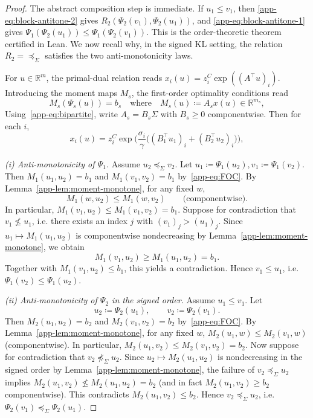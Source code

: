 \documentclass{article}
\theoremstyle{plain}
\newcommand{\eqdef}{\coloneqq}
\newcommand{\RR}{\mathbb{R}}
\newcommand{\z}{z}
\newcommand{\zC}{\z^C}
\begin{document}
\begin{proof}
The abstract composition step is immediate. If $u_1\le v_1$, then
\eqref{app-eq:block-antitone-2} gives
$R_2(\Psi_2(v_1),\Psi_2(u_1))$, and \eqref{app-eq:block-antitone-1} gives
$\Psi_1(\Psi_2(u_1))\le\Psi_1(\Psi_2(v_1))$.
This is the order-theoretic theorem certified in Lean. We now recall why, in the signed KL
setting, the relation $R_2=\preceq_\Sigma$ satisfies the two anti-monotonicity laws.

For $u \in \RR^m$, the primal-dual relation reads 
$
  x_i(u)= \zC_i \exp( (A^\top u)_i ).
$
Introducing the moment maps $M_s$, the first-order optimality conditions read
\begin{equation}\label{app-eq:FOC}
  M_s(\Psi_s(u))=b_s
  \quad\text{where}\quad 
  M_s(u) \eqdef A_s x(u) \in \RR^{m_s}, 
\end{equation}
%
Using~\eqref{app-eq:bipartite}, write $A_s=B_s\Sigma$ with $B_s\ge 0$ componentwise.
Then for each $i$,
\begin{equation}\label{app-eq:x_signed}
x_i(u) = \zC_i\exp\!\Big(\frac{\sigma_i}{\gamma}\big((B_1^\top u_1)_i+(B_2^\top u_2)_i\big)\Big),
\end{equation}

\noindent\textit{(i) Anti-monotonicity of $\Psi_1$.}
Assume $u_2\preceq_\Sigma v_2$. Let
$
u_1\eqdef \Psi_1(u_2), v_1\eqdef \Psi_1(v_2).
$
Then $M_1(u_1,u_2)=b_1$ and $M_1(v_1,v_2)=b_1$ by~\eqref{app-eq:FOC}.
By Lemma~\ref{app-lem:moment-monotone}, for any fixed $w$,
\begin{equation}\label{app-eq:M1_u2_mono}
M_1(w,u_2) \le M_1(w,v_2)\qquad\text{(componentwise).}
\end{equation}
In particular, $M_1(v_1,u_2)\le M_1(v_1,v_2)=b_1$.
%
Suppose for contradiction that $v_1\not\le u_1$, i.e. there exists an index $j$ with $(v_1)_j>(u_1)_j$.
Since $u_1\mapsto M_1(u_1,u_2)$ is componentwise nondecreasing by Lemma~\ref{app-lem:moment-monotone},
we obtain
\[
M_1(v_1,u_2) \ge M_1(u_1,u_2)=b_1.
\]
Together with $M_1(v_1,u_2)\le b_1$, this yields a contradiction. Hence $v_1\le u_1$, i.e. $\Psi_1(v_2)\le \Psi_1(u_2)$.


\noindent\textit{(ii) Anti-monotonicity of $\Psi_2$ in the signed order.}
Assume $u_1\le v_1$. Let
\[
u_2\eqdef \Psi_2(u_1),\qquad v_2\eqdef \Psi_2(v_1).
\]
Then $M_2(u_1,u_2)=b_2$ and $M_2(v_1,v_2)=b_2$ by~\eqref{app-eq:FOC}.
By Lemma~\ref{app-lem:moment-monotone}, for any fixed $w$,
$M_2(u_1,w) \le M_2(v_1,w)$ (componentwise).
In particular, $M_2(u_1,v_2)\le M_2(v_1,v_2)=b_2$.
%
Now suppose for contradiction that $v_2\not\preceq_\Sigma u_2$.
Since $u_2\mapsto M_2(u_1,u_2)$ is nondecreasing in the signed order by Lemma~\ref{app-lem:moment-monotone},
the failure of $v_2\preceq_\Sigma u_2$ implies $M_2(u_1,v_2)\not\le M_2(u_1,u_2)=b_2$ (and in fact
$M_2(u_1,v_2)\ge b_2$ componentwise).
This contradicts $M_2(u_1,v_2)\le b_2$. Hence $v_2\preceq_\Sigma u_2$, i.e. $\Psi_2(v_1)\preceq_\Sigma \Psi_2(u_1)$.


\end{proof}
\end{document}
